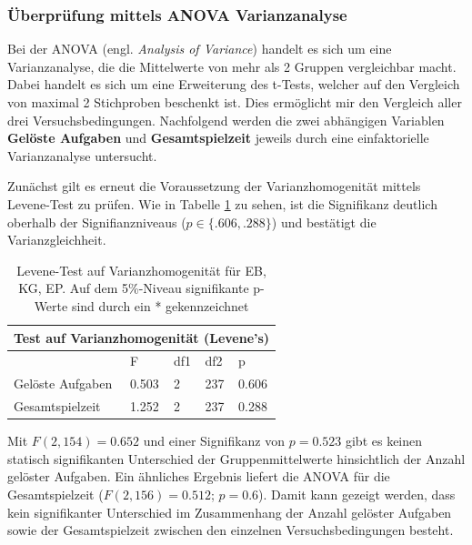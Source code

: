 \subsubsection{Überprüfung mittels ANOVA Varianzanalyse }
Bei der ANOVA (engl. \textit{Analysis of Variance}) handelt es sich um eine Varianzanalyse, die die Mittelwerte von mehr als 2 Gruppen vergleichbar macht. Dabei handelt es sich um eine Erweiterung des t-Tests, welcher auf den Vergleich von maximal 2 Stichproben beschenkt ist. Dies ermöglicht mir den Vergleich aller drei Versuchsbedingungen. Nachfolgend werden die zwei abhängigen Variablen \textbf{Gelöste Aufgaben} und \textbf{Gesamtspielzeit} jeweils durch eine einfaktorielle Varianzanalyse untersucht.

Zunächst gilt es erneut die Voraussetzung der Varianzhomogenität mittels Levene-Test zu prüfen. Wie in Tabelle \ref{levene_amova} zu sehen, ist die Signifikanz deutlich oberhalb der Signifianzniveaus ($p\in \{.606, .288\}$) und bestätigt die Varianzgleichheit.

\begin{table}[htbp]
\centering
\begin{tabular}{ |p{4cm}||p{2.0cm}|p{2.0cm}|p{2.0cm}|p{2.0cm}| }
 \hline
 \multicolumn{5}{|c|}{Test auf Varianzhomogenität (Levene's)} \\
 \hline
 & F & df1 &df2 &p \\
 \hline
  Gelöste Aufgaben      & 0.503     & 2 &   237 & 0.606\\
  Gesamtspielzeit       & 1.252     & 2 &   237 & 0.288\\
 \hline
\end{tabular}
\caption{Levene-Test auf Varianzhomogenität für EB, KG, EP. Auf dem 5\%-Niveau signifikante p-Werte sind durch ein * gekennzeichnet}
\label{levene_amova}
\end{table}

Mit $F(2,154) = 0.652$ und einer Signifikanz von $p=0.523$ gibt es keinen statisch signifikanten Unterschied der Gruppenmittelwerte hinsichtlich der Anzahl gelöster Aufgaben. Ein ähnliches Ergebnis liefert die ANOVA für die Gesamtspielzeit ($F(2, 156)=0.512$; $p=0.6$). Damit kann gezeigt werden, dass kein signifikanter Unterschied im Zusammenhang der Anzahl gelöster Aufgaben sowie der Gesamtspielzeit zwischen den einzelnen Versuchsbedingungen besteht.


